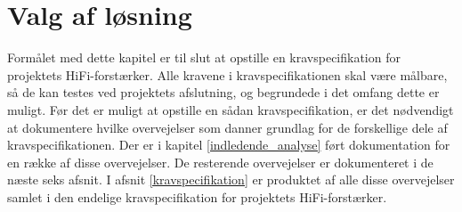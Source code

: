 \chapter{Valg af løsning}
\label{valgafloesning}
Formålet med dette kapitel er til slut at opstille en kravspecifikation for projektets HiFi-forstærker. Alle kravene i kravspecifikationen skal være målbare, så de kan testes ved projektets afslutning, og begrundede i det omfang dette er muligt. Før det er muligt at opstille en sådan kravspecifikation, er det nødvendigt at dokumentere hvilke overvejelser som danner grundlag for de forskellige dele af kravspecifikationen. Der er i kapitel \ref{indledende_analyse} ført dokumentation for en række af disse overvejelser. De resterende overvejelser er dokumenteret i de næste seks afsnit. I afsnit \ref{kravspecifikation} er produktet af alle disse overvejelser samlet i den endelige kravspecifikation for projektets HiFi-forstærker. 
